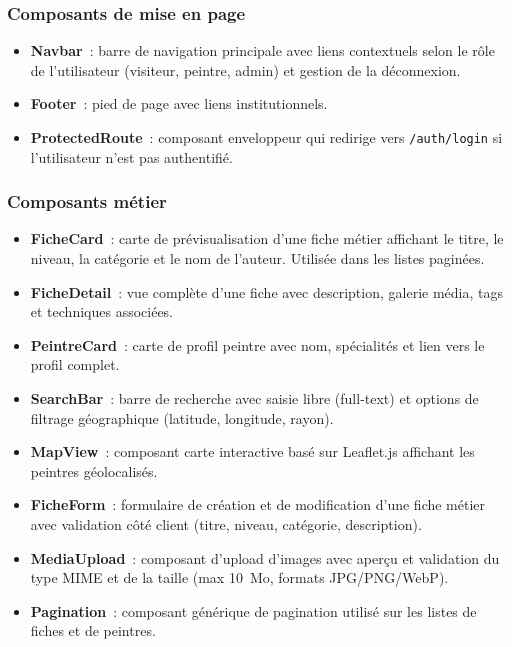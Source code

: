 \documentclass[12pt,a4paper]{report}
\begin{document}
\subsubsection*{Composants de mise en page}

\begin{itemize}
  \item \textbf{Navbar}~: barre de navigation principale avec liens
    contextuels selon le rôle de l'utilisateur (visiteur, peintre, admin)
    et gestion de la déconnexion.

  \item \textbf{Footer}~: pied de page avec liens institutionnels.

  \item \textbf{ProtectedRoute}~: composant enveloppeur qui redirige vers
    \texttt{/auth/login} si l'utilisateur n'est pas authentifié.
\end{itemize}

\subsubsection*{Composants métier}

\begin{itemize}
  \item \textbf{FicheCard}~: carte de prévisualisation d'une fiche métier
    affichant le titre, le niveau, la catégorie et le nom de l'auteur.
    Utilisée dans les listes paginées.

  \item \textbf{FicheDetail}~: vue complète d'une fiche avec description,
    galerie média, tags et techniques associées.

  \item \textbf{PeintreCard}~: carte de profil peintre avec nom,
    spécialités et lien vers le profil complet.

  \item \textbf{SearchBar}~: barre de recherche avec saisie libre
    (full-text) et options de filtrage géographique (latitude, longitude,
    rayon).

  \item \textbf{MapView}~: composant carte interactive basé sur Leaflet.js
    affichant les peintres géolocalisés.

  \item \textbf{FicheForm}~: formulaire de création et de modification
    d'une fiche métier avec validation côté client (titre, niveau,
    catégorie, description).

  \item \textbf{MediaUpload}~: composant d'upload d'images avec aperçu et
    validation du type MIME et de la taille (max 10~Mo, formats
    JPG/PNG/WebP).

  \item \textbf{Pagination}~: composant générique de pagination utilisé sur
    les listes de fiches et de peintres.
\end{itemize}
\end{document}
